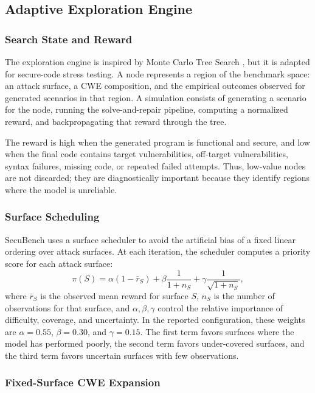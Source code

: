 \documentclass[11pt]{article}
\newcommand{\toolname}{SecuBench}
\begin{document}
\subsection{Adaptive Exploration Engine}

\subsubsection{Search State and Reward}

The exploration engine is inspired by Monte Carlo Tree Search \cite{kocsis2006mcts,majdinasab2025prism}, but it is adapted for secure-code stress testing. A node represents a region of the benchmark space: an attack surface, a CWE composition, and the empirical outcomes observed for generated scenarios in that region. A simulation consists of generating a scenario for the node, running the solve-and-repair pipeline, computing a normalized reward, and backpropagating that reward through the tree.

The reward is high when the generated program is functional and secure, and low when the final code contains target vulnerabilities, off-target vulnerabilities, syntax failures, missing code, or repeated failed attempts. Thus, low-value nodes are not discarded; they are diagnostically important because they identify regions where the model is unreliable.

\subsubsection{Surface Scheduling}

\toolname{} uses a surface scheduler to avoid the artificial bias of a fixed linear ordering over attack surfaces. At each iteration, the scheduler computes a priority score for each attack surface:
\[
    \pi(S) =
    \alpha \left(1-\bar{r}_{S}\right)
    + \beta \frac{1}{1+n_{S}}
    + \gamma \frac{1}{\sqrt{1+n_{S}}},
    \label{eq:surface-priority}
\]
where \(\bar{r}_{S}\) is the observed mean reward for surface \(S\), \(n_{S}\) is the number of observations for that surface, and \(\alpha,\beta,\gamma\) control the relative importance of difficulty, coverage, and uncertainty. In the reported configuration, these weights are \(\alpha=0.55\), \(\beta=0.30\), and \(\gamma=0.15\). The first term favors surfaces where the model has performed poorly, the second term favors under-covered surfaces, and the third term favors uncertain surfaces with few observations.

\subsubsection{Fixed-Surface CWE Expansion}
\end{document}
